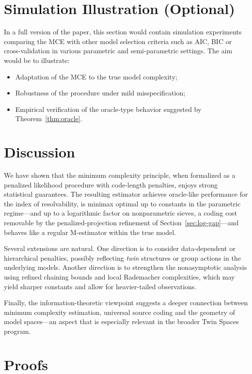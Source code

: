\documentclass[12pt]{article}
\numberwithin{equation}{section}
\begin{document}
	\section{Simulation Illustration (Optional)}
	\label{sec:simulations}
	
	In a full version of the paper, this section would contain simulation
	experiments comparing the MCE with other model selection criteria such
	as AIC, BIC or cross-validation in various parametric and semi-parametric
	settings. The aim would be to illustrate:
	\begin{itemize}
		\item Adaptation of the MCE to the true model complexity;
		\item Robustness of the procedure under mild misspecification;
		\item Empirical verification of the oracle-type behavior suggested
		by Theorem~\ref{thm:oracle}.
	\end{itemize}
	
	\section{Discussion}
	\label{sec:discussion}
	
	We have shown that the minimum complexity principle, when formalized
	as a penalized likelihood procedure with code-length penalties, enjoys
	strong statistical guarantees. The resulting estimator achieves
	oracle-like performance for the index of resolvability, is minimax optimal
	up to constants in the parametric regime---and up to a logarithmic factor on
	nonparametric sieves, a coding cost removable by the penalized-projection
	refinement of Section~\ref{sec:log-gap}---and behaves like a regular
	M-estimator within the true model.
	
	Several extensions are natural. One direction is to consider
	data-dependent or hierarchical penalties, possibly reflecting
	\emph{twin} structures or group actions in the underlying models.
	Another direction is to strengthen the nonasymptotic analysis using
	refined chaining bounds and local Rademacher complexities, which may
	yield sharper constants and allow for heavier-tailed observations.
	
	Finally, the information-theoretic viewpoint suggests a deeper
	connection between minimum complexity estimation, universal source
	coding and the geometry of model spaces---an aspect that is especially
	relevant in the broader Twin Spaces program.
	
	\section{Proofs}
	\label{sec:proofs}
	
\end{document}
